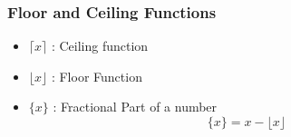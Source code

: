 \documentclass{beamer}
\begin{document}
\begin{frame}
\frametitle{Floor and Ceiling Functions}

{
\large
\begin{itemize}
\item $\lceil x\rceil$ : Ceiling function
\item $\lfloor x\rfloor$  : Floor Function
\item $\{x\}$ : Fractional Part of a number
\[\{x\} = x- \lfloor x\rfloor \]
\end{itemize}
}
\end{frame}
\end{document}
